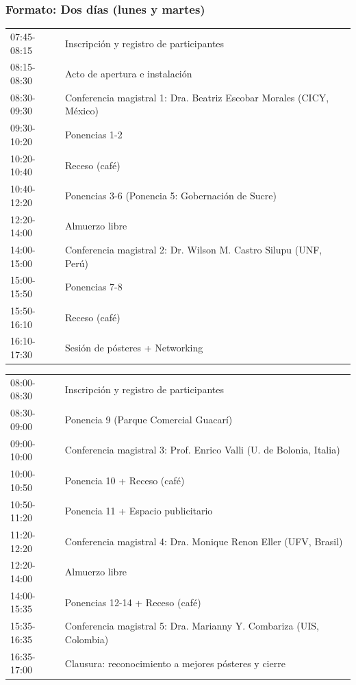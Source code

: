 \documentclass[12pt,a4paper]{article}
\begin{document}
\subsubsection{Formato: Dos días (lunes y martes)}

\begin{tcolorbox}[cajadef, title=Día 1 - Lunes 19 de octubre]
\small
\begin{tabular}{ll}
07:45-08:15 & Inscripción y registro de participantes \\
08:15-08:30 & Acto de apertura e instalación \\
08:30-09:30 & Conferencia magistral 1: Dra. Beatriz Escobar Morales (CICY, México) \\
09:30-10:20 & Ponencias 1-2 \\
10:20-10:40 & Receso (café) \\
10:40-12:20 & Ponencias 3-6 (Ponencia 5: Gobernación de Sucre) \\
12:20-14:00 & Almuerzo libre \\
14:00-15:00 & Conferencia magistral 2: Dr. Wilson M. Castro Silupu (UNF, Perú) \\
15:00-15:50 & Ponencias 7-8 \\
15:50-16:10 & Receso (café) \\
16:10-17:30 & Sesión de pósteres + Networking \\
\end{tabular}
\end{tcolorbox}

\begin{tcolorbox}[cajadef, title=Día 2 - Martes 20 de octubre]
\small
\begin{tabular}{ll}
08:00-08:30 & Inscripción y registro de participantes \\
08:30-09:00 & Ponencia 9 (Parque Comercial Guacarí) \\
09:00-10:00 & Conferencia magistral 3: Prof. Enrico Valli (U. de Bolonia, Italia) \\
10:00-10:50 & Ponencia 10 + Receso (café) \\
10:50-11:20 & Ponencia 11 + Espacio publicitario \\
11:20-12:20 & Conferencia magistral 4: Dra. Monique Renon Eller (UFV, Brasil) \\
12:20-14:00 & Almuerzo libre \\
14:00-15:35 & Ponencias 12-14 + Receso (café) \\
15:35-16:35 & Conferencia magistral 5: Dra. Marianny Y. Combariza (UIS, Colombia) \\
16:35-17:00 & Clausura: reconocimiento a mejores pósteres y cierre \\
\end{tabular}
\end{tcolorbox}
\end{document}
